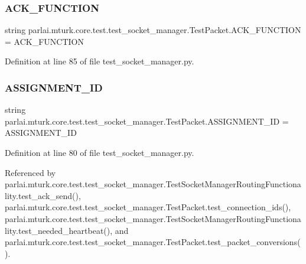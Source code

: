 \subsubsection{\texorpdfstring{A\+C\+K\+\_\+\+F\+U\+N\+C\+T\+I\+ON}{ACK\_FUNCTION}}
{\footnotesize\ttfamily string parlai.\+mturk.\+core.\+test.\+test\+\_\+socket\+\_\+manager.\+Test\+Packet.\+A\+C\+K\+\_\+\+F\+U\+N\+C\+T\+I\+ON = \textquotesingle{}A\+C\+K\+\_\+\+F\+U\+N\+C\+T\+I\+ON\textquotesingle{}\hspace{0.3cm}{\ttfamily [static]}}



Definition at line 85 of file test\+\_\+socket\+\_\+manager.\+py.

\mbox{\label{classparlai_1_1mturk_1_1core_1_1test_1_1test__socket__manager_1_1TestPacket_ad6144847ca4ea713aac5cba8d5d79a6f}} 
\subsubsection{\texorpdfstring{A\+S\+S\+I\+G\+N\+M\+E\+N\+T\+\_\+\+ID}{ASSIGNMENT\_ID}}
{\footnotesize\ttfamily string parlai.\+mturk.\+core.\+test.\+test\+\_\+socket\+\_\+manager.\+Test\+Packet.\+A\+S\+S\+I\+G\+N\+M\+E\+N\+T\+\_\+\+ID = \textquotesingle{}A\+S\+S\+I\+G\+N\+M\+E\+N\+T\+\_\+\+ID\textquotesingle{}\hspace{0.3cm}{\ttfamily [static]}}



Definition at line 80 of file test\+\_\+socket\+\_\+manager.\+py.



Referenced by parlai.\+mturk.\+core.\+test.\+test\+\_\+socket\+\_\+manager.\+Test\+Socket\+Manager\+Routing\+Functionality.\+test\+\_\+ack\+\_\+send(), parlai.\+mturk.\+core.\+test.\+test\+\_\+socket\+\_\+manager.\+Test\+Packet.\+test\+\_\+connection\+\_\+ids(), parlai.\+mturk.\+core.\+test.\+test\+\_\+socket\+\_\+manager.\+Test\+Socket\+Manager\+Routing\+Functionality.\+test\+\_\+needed\+\_\+heartbeat(), and parlai.\+mturk.\+core.\+test.\+test\+\_\+socket\+\_\+manager.\+Test\+Packet.\+test\+\_\+packet\+\_\+conversions().

